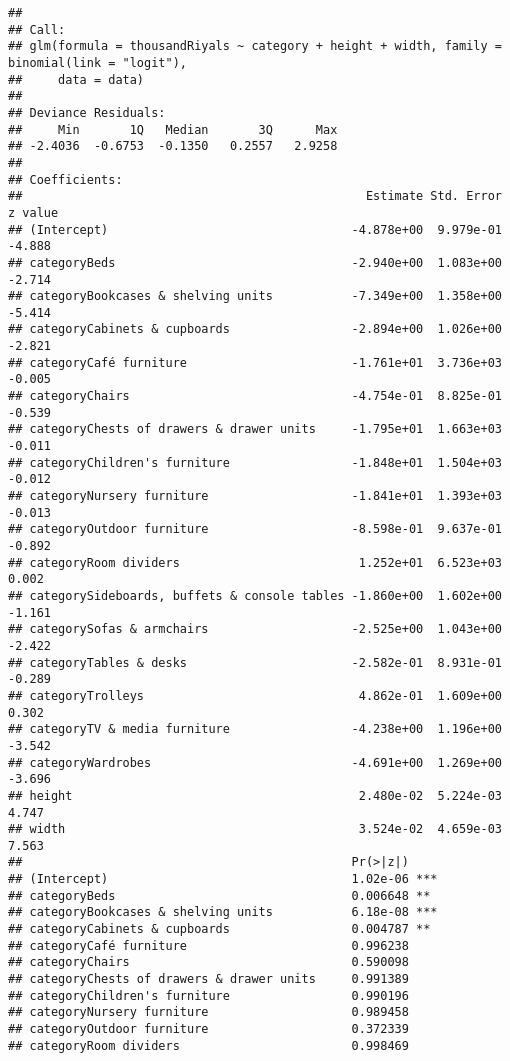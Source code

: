 \documentclass[
]{article}
\begin{document}
\begin{verbatim}
## 
## Call:
## glm(formula = thousandRiyals ~ category + height + width, family = binomial(link = "logit"), 
##     data = data)
## 
## Deviance Residuals: 
##     Min       1Q   Median       3Q      Max  
## -2.4036  -0.6753  -0.1350   0.2557   2.9258  
## 
## Coefficients:
##                                                Estimate Std. Error z value
## (Intercept)                                  -4.878e+00  9.979e-01  -4.888
## categoryBeds                                 -2.940e+00  1.083e+00  -2.714
## categoryBookcases & shelving units           -7.349e+00  1.358e+00  -5.414
## categoryCabinets & cupboards                 -2.894e+00  1.026e+00  -2.821
## categoryCafé furniture                       -1.761e+01  3.736e+03  -0.005
## categoryChairs                               -4.754e-01  8.825e-01  -0.539
## categoryChests of drawers & drawer units     -1.795e+01  1.663e+03  -0.011
## categoryChildren's furniture                 -1.848e+01  1.504e+03  -0.012
## categoryNursery furniture                    -1.841e+01  1.393e+03  -0.013
## categoryOutdoor furniture                    -8.598e-01  9.637e-01  -0.892
## categoryRoom dividers                         1.252e+01  6.523e+03   0.002
## categorySideboards, buffets & console tables -1.860e+00  1.602e+00  -1.161
## categorySofas & armchairs                    -2.525e+00  1.043e+00  -2.422
## categoryTables & desks                       -2.582e-01  8.931e-01  -0.289
## categoryTrolleys                              4.862e-01  1.609e+00   0.302
## categoryTV & media furniture                 -4.238e+00  1.196e+00  -3.542
## categoryWardrobes                            -4.691e+00  1.269e+00  -3.696
## height                                        2.480e-02  5.224e-03   4.747
## width                                         3.524e-02  4.659e-03   7.563
##                                              Pr(>|z|)    
## (Intercept)                                  1.02e-06 ***
## categoryBeds                                 0.006648 ** 
## categoryBookcases & shelving units           6.18e-08 ***
## categoryCabinets & cupboards                 0.004787 ** 
## categoryCafé furniture                       0.996238    
## categoryChairs                               0.590098    
## categoryChests of drawers & drawer units     0.991389    
## categoryChildren's furniture                 0.990196    
## categoryNursery furniture                    0.989458    
## categoryOutdoor furniture                    0.372339    
## categoryRoom dividers                        0.998469    

\end{verbatim}
\end{document}
